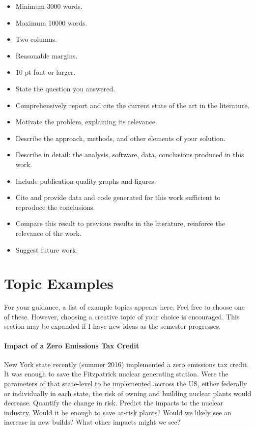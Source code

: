 \documentclass[12pts, answers]{exam}
\begin{document}
\begin{questions}
\begin{itemize}
\item Minimum 3000 words.
\item Maximum 10000 words.
\item Two columns.
\item Reasonable margins.
\item 10 pt font or larger.
\item State the question you answered.
\item Comprehensively report and cite the current state of the art in the literature.
\item Motivate the problem, explaining its relevance.
\item Describe the approach, methods, and other elements of your solution.
\item Describe in detail: the analysis, software, data, conclusions produced in this work.
\item Include publication quality graphs and figures.
\item Cite and provide data and code generated for this work sufficient to reproduce the conclusions.
\item Compare this result to previous results in the literature, reinforce the relevance of the work.
\item Suggest future work.
\end{itemize}

\end{questions}


\section*{Topic Examples}
For your guidance, a list of example topics appears here.
Feel free to choose one of these.  However, choosing a creative topic
of your choice is encouraged. This section may be expanded if I have new ideas
as the semester progresses.

\paragraph{Impact of a Zero Emissions Tax Credit} New York state recently
(summer 2016) implemented a zero emissions tax credit. It was enough to save
the Fitzpatrick nuclear generating station. Were the parameters of that
state-level to be implemented accross the US, either federally or individually
in each state, the risk of owning and building nuclear plants would decrease.
Quantify the change in risk. Predict the impacts to the nuclear industry. Would
it be enough to save at-risk plants? Would we likely see an increase in new
builds? What other impacts might we see?
\end{document}
